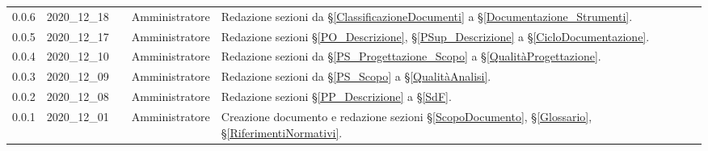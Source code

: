 {\begin{longtable}{ c c  C{2.3cm} C{3cm} C{3.2cm}}
    0.0.6 & 2020\_12\_18 & \TG{}  & Amministratore & Redazione sezioni da \S\ref{ClassificazioneDocumenti} a \S\ref{Documentazione_Strumenti}. \\
    
    0.0.5 & 2020\_12\_17 & \TG{} & Amministratore  & Redazione sezioni \S\ref{PO_Descrizione}, \S\ref{PSup_Descrizione} a \S\ref{CicloDocumentazione}. \\
    
     0.0.4 & 2020\_12\_10 & \TG{} & Amministratore  & Redazione sezioni da \S\ref{PS_Progettazione_Scopo} a \S\ref{QualitàProgettazione}. \\
    
     0.0.3 & 2020\_12\_09 & \TG{} & Amministratore  & Redazione sezioni da \S\ref{PS_Scopo} a \S\ref{QualitàAnalisi}.  \\
     
     0.0.2 & 2020\_12\_08 & \TG{} & Amministratore  & Redazione sezioni \S\ref{PP_Descrizione} a \S\ref{SdF}.  \\      
            
    0.0.1 & 2020\_12\_01 & \TG{} & Amministratore  & Creazione documento e redazione sezioni \S\ref{ScopoDocumento}, \S\ref{Glossario}, \S\ref{RiferimentiNormativi}.  \\
			
\end{longtable}
}
